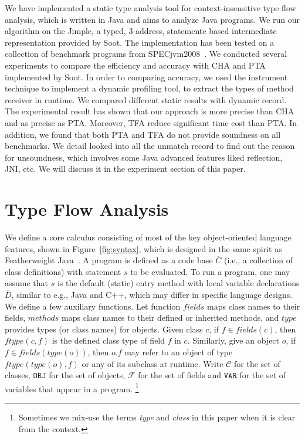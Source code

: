 \documentclass{fac}
\newcommand{\keyword}[1]{\mathsf{#1}}
\newcommand{\kwnull}[0]{\keyword{null}}
\newcommand\Var{\mathtt{VAR}}
\newcommand\Val{\mathtt{V}}
\newcommand\Obj{\mathtt{OBJ}}
\newcommand{\Class}{\mathcal{C}}
\newcommand{\Field}{\mathcal{F}}
\newcommand\set[1]{\{#1\}}
\begin{document}
We have implemented a static type analysis tool for context-insensitive type flow analysis, which is written in Java and aims to analyze Java programs. We run our algorithm on the Jimple, a typed, 3-address, statemente based intermediate representation provided by Soot. The implementation has been tested on a collection of benchmark programs from SPECjvm2008~\cite{specjvm}. We conducted several experiments to compare the efficiency and accuracy with CHA and PTA implemented by Soot. In order to comparing accuracy, we used the instrument technique to implement a dynamic profiling tool, to extract the types of method receiver in runtime. We compared different static results with dynamic record. The experimental result has shown that our approach is more precise than CHA and as precise as PTA. Moreover, TFA reduce significant time cost than PTA. In addition, we found that both PTA and TFA do not provide soundness on all benchmarks. We detail looked into all the unmatch record to find out the reason for unsoundness, which involves some Java advanced features liked reflection, JNI, etc. We will discuss it in the experiment section of this paper. %

\section{Type Flow Analysis}\label{sec:type-flow-analysis}
We define a core calculus consisting of most of the key object-oriented language features, shown in Figure~\ref{fig:syntax}, which is designed in the same spirit as Featherweight Java~\cite{Igarashi2001}.
A program is defined as a code base $\overline{C}$ (i.e., a collection of class definitions) with statement $s$ to be evaluated.
To run a program, one may assume that $s$ is the default (static) entry method with local variable declarations $\overline{D}$,
similar to e.g., Java and C++, which may differ in specific language designs.
We define a few auxiliary functions. Let function $fields$ maps class names to their fields, $methods$ maps class names to their defined or inherited methods, and $type$ provides types (or class names) for objects. Given class $c$, if $f\in fields(c)$, then $ftype(c,f)$ is the defined class type of field $f$ in $c$. Similarly, give an object $o$, if $f\in fields(type(o))$, then $o.f$ may refer to an object of type $ftype(type(o),f)$ or %
any of its subclass at runtime. Write $\Class$ for the set of classes, $\Obj$ for the set of objects, $\Field$ for the set of fields and $\Var$ for the set of variables that appear in a program.
\footnote{Sometimes we mix-use the terms \emph{type} and \emph{class} in this paper when it is clear from the context.}
\end{document}
